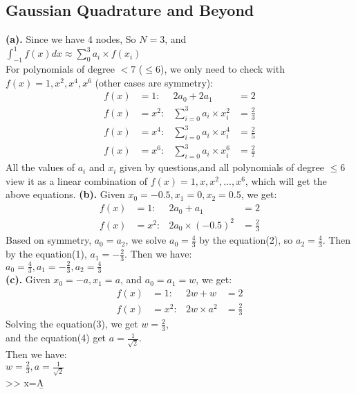 \subsection{Gaussian Quadrature and Beyond}
\textbf{(a).}
Since we have 4 nodes, So $N=3$, and\\
$\int^1_{-1} f(x)dx\approx \sum^3_0 a_i\times  f(x_i)$\\
For polynomials of degree $<7$ ($\leq 6$), we only need to check with
$f(x)=1, x^2, x^4, x^6$ (other cases are symmetry):
\begin{align*}
f(x)&=1  :& 2a_0+2a_1&=2\\
f(x)&=x^2:&\sum^3_{i=0} a_i \times x_i^2&=\frac{2}{3}\\
f(x)&=x^4:&\sum^3_{i=0} a_i \times x_i^4&=\frac{2}{5}\\
f(x)&=x^6:&\sum^3_{i=0} a_i \times x_i^6&=\frac{2}{7}
\end{align*}
All the values of $a_i$ and $x_i$ given by questions,and all polynomials of degree $\leq 6$ view it as a linear combination of $f(x)=1, x, x^2, ... , x^6$, which will get the above equations.
\newpage
\textbf{(b).}
Given $x_0=-0.5, x_1=0, x_2=0.5$, we get:
\begin{align}
f(x)&=1  :& 2a_0+a_1&=2\\
f(x)&=x^2:& 2a_0\times(-0.5)^2&=\frac{2}{3}
\end{align}
Based on symmetry, $a_0=a_2$, we solve $a_0=\frac{4}{3}$ by the equation(2), so $a_2=\frac{4}{3}$. Then by the equation(1), $a_1=-\frac{2}{3}$. Then we have:\\
$a_0=\frac{4}{3}, a_1=-\frac{2}{3}, a_2=\frac{4}{3}$\\
\newpage
\textbf{(c).}
Given $x_0=-a, x_1=a$, and $a_0=a_1=w$, we get:
\begin{align}
f(x)&=1  :& 2w+w&=2\\
f(x)&=x^2: & 2w\times a^2&=\frac{2}{3}
\end{align}
Solving the equation(3), we get $w=\frac{2}{3}$,\\and the equation(4) get $a=\frac1{\sqrt2}$. \\Then we have:\\
$w=\frac{2}{3}, a=\frac{1}{\sqrt 2}$\\


>> x=A\b

\section*{}
\setcounter{section}{10}
